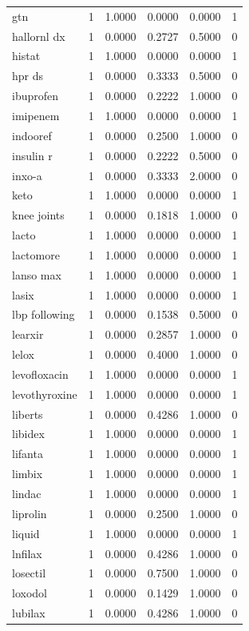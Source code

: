 \begin{longtable}{p{3.0cm}rrrrr}
gtn & 1 & 1.0000 & 0.0000 & 0.0000 & 1 \\
hallornl dx & 1 & 0.0000 & 0.2727 & 0.5000 & 0 \\
histat & 1 & 1.0000 & 0.0000 & 0.0000 & 1 \\
hpr ds & 1 & 0.0000 & 0.3333 & 0.5000 & 0 \\
ibuprofen & 1 & 0.0000 & 0.2222 & 1.0000 & 0 \\
imipenem & 1 & 1.0000 & 0.0000 & 0.0000 & 1 \\
indooref & 1 & 0.0000 & 0.2500 & 1.0000 & 0 \\
insulin r & 1 & 0.0000 & 0.2222 & 0.5000 & 0 \\
inxo-a & 1 & 0.0000 & 0.3333 & 2.0000 & 0 \\
keto & 1 & 1.0000 & 0.0000 & 0.0000 & 1 \\
knee joints & 1 & 0.0000 & 0.1818 & 1.0000 & 0 \\
lacto & 1 & 1.0000 & 0.0000 & 0.0000 & 1 \\
lactomore & 1 & 1.0000 & 0.0000 & 0.0000 & 1 \\
lanso max & 1 & 1.0000 & 0.0000 & 0.0000 & 1 \\
lasix & 1 & 1.0000 & 0.0000 & 0.0000 & 1 \\
lbp following & 1 & 0.0000 & 0.1538 & 0.5000 & 0 \\
learxir & 1 & 0.0000 & 0.2857 & 1.0000 & 0 \\
lelox & 1 & 0.0000 & 0.4000 & 1.0000 & 0 \\
levofloxacin & 1 & 1.0000 & 0.0000 & 0.0000 & 1 \\
levothyroxine & 1 & 1.0000 & 0.0000 & 0.0000 & 1 \\
liberts & 1 & 0.0000 & 0.4286 & 1.0000 & 0 \\
libidex & 1 & 1.0000 & 0.0000 & 0.0000 & 1 \\
lifanta & 1 & 1.0000 & 0.0000 & 0.0000 & 1 \\
limbix & 1 & 1.0000 & 0.0000 & 0.0000 & 1 \\
lindac & 1 & 1.0000 & 0.0000 & 0.0000 & 1 \\
liprolin & 1 & 0.0000 & 0.2500 & 1.0000 & 0 \\
liquid & 1 & 1.0000 & 0.0000 & 0.0000 & 1 \\
lnfilax & 1 & 0.0000 & 0.4286 & 1.0000 & 0 \\
losectil & 1 & 0.0000 & 0.7500 & 1.0000 & 0 \\
loxodol & 1 & 0.0000 & 0.1429 & 1.0000 & 0 \\
lubilax & 1 & 0.0000 & 0.4286 & 1.0000 & 0 \\

\end{longtable}
